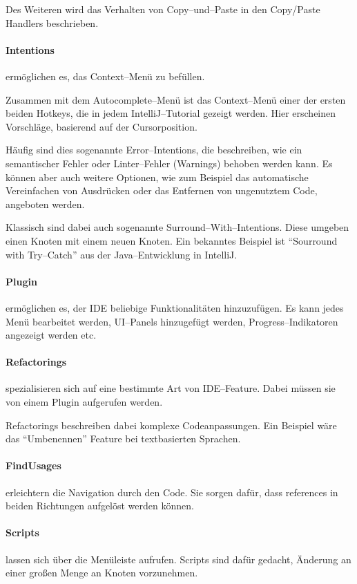 Des Weiteren wird das Verhalten von Copy--und--Paste in den {\ttfamily Copy/Paste Handlers} beschrieben.

\paragraph{Intentions} ermöglichen es, das Context--Menü zu befüllen.

Zusammen mit dem Autocomplete--Menü ist das Context--Menü einer der ersten beiden Hotkeys, die in jedem IntelliJ--Tutorial gezeigt werden.
Hier erscheinen Vorschläge, basierend auf der Cursorposition.

Häufig sind dies sogenannte Error--Intentions, die beschreiben, wie ein semantischer Fehler oder Linter--Fehler (Warnings) behoben werden kann.
Es können aber auch weitere Optionen, wie zum Beispiel das automatische Vereinfachen von Ausdrücken oder das Entfernen von ungenutztem Code, angeboten werden.

Klassisch sind dabei auch sogenannte Surround--With--Intentions.
Diese umgeben einen Knoten mit einem neuen Knoten.
Ein bekanntes Beispiel ist \enquote{Sourround with Try--Catch} aus der Java--Entwicklung in IntelliJ\@.

\paragraph{Plugin} ermöglichen es, der \ac{IDE} beliebige Funktionalitäten hinzuzufügen.
Es kann jedes Menü bearbeitet werden, \ac{UI}--Panels hinzugefügt werden, Progress--Indikatoren angezeigt werden etc.

\paragraph{Refactorings} spezialisieren sich auf eine bestimmte Art von \acs{IDE}--Feature.
Dabei müssen sie von einem Plugin aufgerufen werden.

Refactorings beschreiben dabei komplexe Codeanpassungen.
Ein Beispiel wäre das \enquote{Umbenennen} Feature bei textbasierten Sprachen.

\paragraph{FindUsages} erleichtern die Navigation durch den Code.
Sie sorgen dafür, dass {\ttfamily references} in beiden Richtungen aufgelöst werden können.

\paragraph{Scripts} lassen sich über die Menüleiste aufrufen.
Scripts sind dafür gedacht, Änderung an einer großen Menge an Knoten vorzunehmen.

